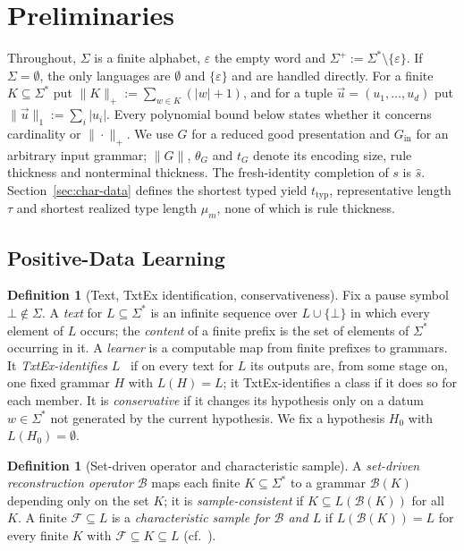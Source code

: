 \documentclass[11pt]{article}
\numberwithin{equation}{section}
\theoremstyle{plain}
\theoremstyle{definition}
\newtheorem{definition}[theorem]{Definition}
\theoremstyle{remark}
\newcommand{\tuple}[1]{\vec{#1}}
\newcommand{\eps}{\varepsilon}
\newcommand{\pausesym}{\bot}
\theoremstyle{plain}
\begin{document}
\section{Preliminaries}
\label{sec:prelim}

Throughout, $\Sigma$ is a finite alphabet, $\eps$ the empty word and
$\Sigma^+:=\Sigma^*\setminus\{\eps\}$.  If $\Sigma=\emptyset$, the only
languages are $\emptyset$ and $\{\eps\}$ and are handled directly.  For a
finite $K\subseteq\Sigma^*$ put $\|K\|_+:=\sum_{w\in K}(|w|+1)$, and for a
tuple $\tuple u=(u_1,\ldots,u_d)$ put $\|\tuple u\|_1:=\sum_i|u_i|$.  Every
polynomial bound below states whether it concerns cardinality or
$\|\cdot\|_+$.  We use $G$ for a reduced good presentation and $G_{\mathrm{in}}$ for
an arbitrary input grammar; $\|G\|$, $\theta_G$ and $t_G$ denote
its encoding size, rule thickness and nonterminal thickness.
The fresh-identity completion of $s$ is $\widehat s$.
Section~\ref{sec:char-data} defines the shortest typed yield
$t_{\mathrm{typ}}$, representative length $\tau$ and shortest
realized type length $\mu_m$, none of which is rule thickness.

\subsection{Positive-Data Learning}

\begin{definition}[Text, TxtEx identification, conservativeness]
Fix a pause symbol $\pausesym\notin\Sigma$.  A \emph{text} for
$L\subseteq\Sigma^*$ is an infinite sequence over $L\cup\{\pausesym\}$ in which
every element of $L$ occurs; the \emph{content} of a finite prefix is the set
of elements of $\Sigma^*$ occurring in it.  A \emph{learner} is a computable map
from finite prefixes to grammars.  It \emph{TxtEx-identifies} $L$~\cite{Gold1967}
if on every text for $L$ its outputs are, from some stage on, one fixed grammar
$H$ with $L(H)=L$; it TxtEx-identifies a class if it does so for each member.
It is \emph{conservative} if it changes its hypothesis only on a datum
$w\in\Sigma^*$ not generated by the current hypothesis.  We fix a hypothesis
$H_0$ with $L(H_0)=\emptyset$.
\end{definition}

\begin{definition}[Set-driven operator and characteristic sample]
\label{def:characteristic-sample}
A \emph{set-driven reconstruction operator} $\mathcal B$ maps each finite
$K\subseteq\Sigma^*$ to a grammar $\mathcal B(K)$ depending only on the set
$K$; it is \emph{sample-consistent} if $K\subseteq L(\mathcal B(K))$ for all
$K$.  A finite $\mathcal F\subseteq L$ is a \emph{characteristic sample for
$\mathcal B$ and $L$} if $L(\mathcal B(K))=L$ for every finite $K$ with
$\mathcal F\subseteq K\subseteq L$ (cf.~\cite{deLaHiguera1997}).
\end{definition}
\end{document}
